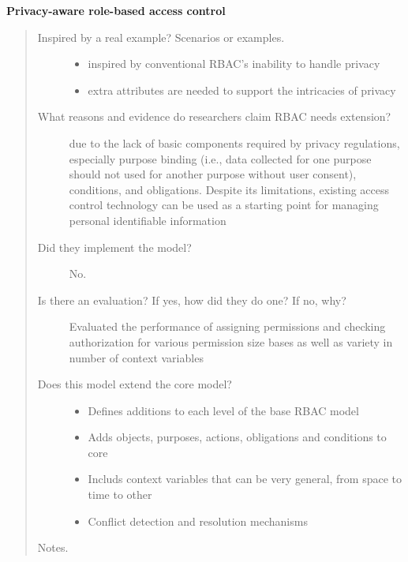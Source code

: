 \documentclass[letterpaper,10pt,english]{sphinxmanual}
\begin{document}
\textbf{Privacy-aware role-based access control}
\begin{quote}
\begin{description}
\item[{Inspired by a real example? Scenarios or examples.}] \leavevmode\begin{itemize}
\item {} 
inspired by conventional RBAC's inability to handle privacy

\item {} 
extra attributes are needed to support the intricacies of privacy

\end{itemize}

\item[{What reasons and evidence do researchers claim RBAC needs extension?}]
due to the lack of basic components required by privacy regulations, especially purpose binding (i.e., data collected for one purpose should not used for another purpose without user consent), conditions, and obligations.  Despite its limitations, existing access control technology can be used as a starting point for managing personal identifiable information

\item[{Did they implement the model?}] \leavevmode
No.

\item[{Is there an evaluation? If yes, how did they do one? If no, why?}] \leavevmode
Evaluated the performance of assigning permissions and checking authorization for various permission size bases as well as variety in number of context variables

\item[{Does this model extend the core model?}] \leavevmode\begin{itemize}
\item {} 
Defines additions to each level of the base RBAC model

\item {} 
Adds objects, purposes, actions, obligations and conditions to core

\item {} 
Includs context variables that can be very general, from space to time to other

\item {} 
Conflict detection and resolution mechanisms

\end{itemize}

\end{description}

Notes.
\end{quote}
\end{document}
